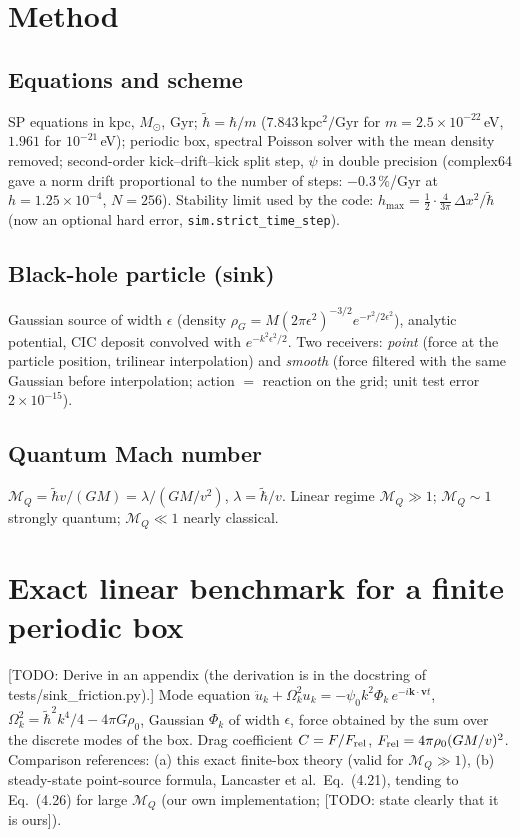 \documentclass[11pt]{article}
\newcommand{\todo}[1]{{\color{red}[TODO: #1]}}
\newcommand{\MQ}{\mathcal{M}_Q}
\begin{document}
\section{Method}
\subsection{Equations and scheme}
SP equations in kpc, $M_\odot$, Gyr; $\tilde\hbar=\hbar/m$ ($7.843\,\mathrm{kpc^2/Gyr}$ for $m=2.5\times10^{-22}$\,eV, $1.961$ for $10^{-21}$\,eV); periodic box, spectral Poisson solver with the mean density removed;
second-order kick--drift--kick split step, $\psi$ in double precision (complex64 gave a norm drift proportional to the number of steps: $-0.3\,\%$/Gyr at $h=1.25\times10^{-4}$, $N=256$).
Stability limit used by the code: $h_{\max}=\frac12\cdot\frac{4}{3\pi}\,\Delta x^2/\tilde\hbar$ (now an optional hard error, \texttt{sim.strict\_time\_step}).
\subsection{Black-hole particle (sink)}
Gaussian source of width $\epsilon$ (density $\rho_G=M(2\pi\epsilon^2)^{-3/2}e^{-r^2/2\epsilon^2}$), analytic potential, CIC deposit convolved with $e^{-k^2\epsilon^2/2}$.
Two receivers: \emph{point} (force at the particle position, trilinear interpolation) and \emph{smooth} (force filtered with the same Gaussian before interpolation; action $=$ reaction on the grid; unit test error $2\times10^{-15}$).
\subsection{Quantum Mach number}
$\MQ=\tilde\hbar v/(GM)=\lambda/(GM/v^2)$, $\lambda=\tilde\hbar/v$. Linear regime $\MQ\gg1$; $\MQ\sim1$ strongly quantum; $\MQ\ll1$ nearly classical.

\section{Exact linear benchmark for a finite periodic box}
\label{sec:theory}
\todo{Derive in an appendix (the derivation is in the docstring of tests/sink\_friction.py).} Mode equation
$\ddot u_k+\Omega_k^2u_k=-\psi_0k^2\Phi_k\,e^{-i\mathbf{k}\cdot\mathbf{v}t}$, $\Omega_k^2=\tilde\hbar^2k^4/4-4\pi G\rho_0$, Gaussian $\Phi_k$ of width $\epsilon$,
force obtained by the sum over the discrete modes of the box. Drag coefficient $C=F/F_{\rm rel}$, $F_{\rm rel}=4\pi\rho_0(GM/v)^2$.
Comparison references: (a) this exact finite-box theory (valid for $\MQ\gg1$), (b) steady-state point-source formula, Lancaster et al.\ Eq.~(4.21), tending to Eq.~(4.26) for large $\MQ$ (our own implementation; \todo{state clearly that it is ours}).
\end{document}
